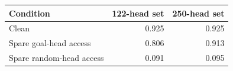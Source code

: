 \begin{tabular}{lrr}\toprule
Condition & 122-head set & 250-head set\\\midrule
Clean & 0.925 & 0.925\\
Spare goal-head access & 0.806 & 0.913\\
Spare random-head access & 0.091 & 0.095\\
\bottomrule\end{tabular}